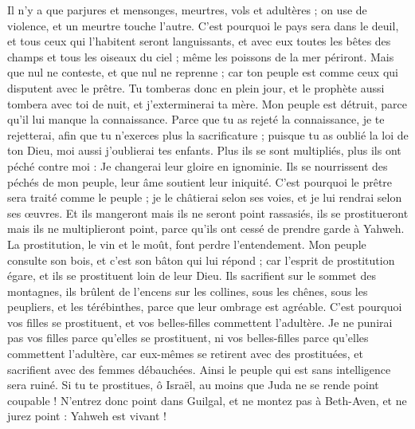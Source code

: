 \begin{multicols}{2}
Il n'y a que parjures et mensonges, meurtres, vols et adultères ; on use de violence, et un meurtre touche l'autre.
C'est pourquoi le pays sera dans le deuil, et tous ceux qui l'habitent seront languissants, et avec eux toutes les bêtes des champs et tous les oiseaux du ciel ; même les poissons de la mer périront.
Mais que nul ne conteste, et que nul ne reprenne ; car ton peuple est comme ceux qui disputent avec le prêtre.
Tu tomberas donc en plein jour, et le prophète aussi tombera avec toi de nuit, et j'exterminerai ta mère.
Mon peuple est détruit, parce qu'il lui manque la connaissance. Parce que tu as rejeté la connaissance, je te rejetterai, afin que tu n'exerces plus la sacrificature ; puisque tu as oublié la loi de ton Dieu, moi aussi j'oublierai tes enfants.
Plus ils se sont multipliés, plus ils ont péché contre moi : Je changerai leur gloire en ignominie.
Ils se nourrissent des péchés de mon peuple, leur âme soutient leur iniquité.
C'est pourquoi le prêtre sera traité comme le peuple ; je le châtierai selon ses voies, et je lui rendrai selon ses œuvres.
Et ils mangeront mais ils ne seront point rassasiés, ils se prostitueront mais ils ne multiplieront point, parce qu'ils ont cessé de prendre garde à Yahweh.
La prostitution, le vin et le moût, font perdre l'entendement.
Mon peuple consulte son bois, et c'est son bâton qui lui répond ; car l'esprit de prostitution égare, et ils se prostituent loin de leur Dieu.
Ils sacrifient sur le sommet des montagnes, ils brûlent de l'encens sur les collines, sous les chênes, sous les peupliers, et les térébinthes, parce que leur ombrage est agréable. C'est pourquoi vos filles se prostituent, et vos belles-filles commettent l'adultère.
Je ne punirai pas vos filles parce qu'elles se prostituent, ni vos belles-filles parce qu'elles commettent l'adultère, car eux-mêmes se retirent avec des prostituées, et sacrifient avec des femmes débauchées. Ainsi le peuple qui est sans intelligence sera ruiné.
Si tu te prostitues, ô Israël, au moins que Juda ne se rende point coupable ! N'entrez donc point dans Guilgal, et ne montez pas à Beth-Aven, et ne jurez point : Yahweh est vivant !

\end{multicols}
